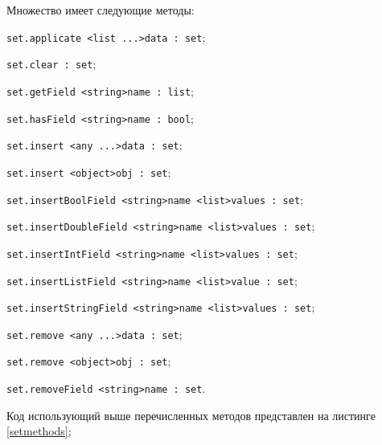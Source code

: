 Множество имеет следующие методы:
\begin{icItems}
\item \lstinline|set.applicate <list ...>data : set|;
\item \lstinline|set.clear : set|;
\item \lstinline|set.getField <string>name : list|;
\item \lstinline|set.hasField <string>name : bool|;
\item \lstinline|set.insert <any ...>data : set|;
\item \lstinline|set.insert <object>obj : set|;
\item \lstinline|set.insertBoolField <string>name <list>values : set|;
\item \lstinline|set.insertDoubleField <string>name <list>values : set|;
\item \lstinline|set.insertIntField <string>name <list>values : set|;
\item \lstinline|set.insertListField <string>name <list>value : set|;
\item \lstinline|set.insertStringField <string>name <list>values : set|;
\item \lstinline|set.remove <any ...>data : set|;
\item \lstinline|set.remove <object>obj : set|;
\item \lstinline|set.removeField <string>name : set|.
\end{icItems}

Код использующий выше перечисленных методов представлен на листинге \ref{setmethods};

